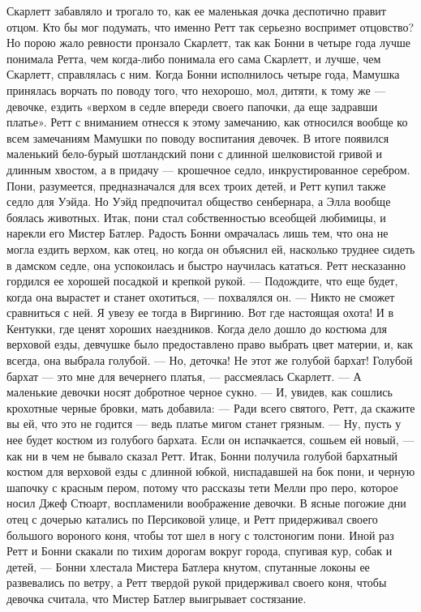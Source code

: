 Скарлетт забавляло и трогало то, как ее маленькая дочка деспотично правит отцом. Кто бы мог подумать, что именно Ретт так серьезно воспримет отцовство? Но порою жало ревности пронзало Скарлетт, так как Бонни в четыре года лучше понимала Ретта, чем когда-либо понимала его сама Скарлетт, и лучше, чем Скарлетт, справлялась с ним.
Когда Бонни исполнилось четыре года, Мамушка принялась ворчать по поводу того, что нехорошо, мол, дитяти, к тому же — девочке, ездить «верхом в седле впереди своего папочки, да еще задравши платье». Ретт с вниманием отнесся к этому замечанию, как относился вообще ко всем замечаниям Мамушки по поводу воспитания девочек. В итоге появился маленький бело-бурый шотландский пони с длинной шелковистой гривой и длинным хвостом, а в придачу — крошечное седло, инкрустированное серебром. Пони, разумеется, предназначался для всех троих детей, и Ретт купил также седло для Уэйда. Но Уэйд предпочитал общество сенбернара, а Элла вообще боялась животных. Итак, пони стал собственностью всеобщей любимицы, и нарекли его Мистер Батлер. Радость Бонни омрачалась лишь тем, что она не могла ездить верхом, как отец, но когда он объяснил ей, насколько труднее сидеть в дамском седле, она успокоилась и быстро научилась кататься. Ретт несказанно гордился ее хорошей посадкой и крепкой рукой.
— Подождите, что еще будет, когда она вырастет и станет охотиться, — похвалялся он. — Никто не сможет сравниться с ней. Я увезу ее тогда в Виргинию. Вот где настоящая охота! И в Кентукки, где ценят хороших наездников. Когда дело дошло до костюма для верховой езды, девчушке было предоставлено право выбрать цвет материи, и, как всегда, она выбрала голубой.
— Но, деточка! Не этот же голубой бархат! Голубой бархат — это мне для вечернего платья, — рассмеялась Скарлетт. — А маленькие девочки носят добротное черное сукно. — И, увидев, как сошлись крохотные черные бровки, мать добавила: — Ради всего святого, Ретт, да скажите вы ей, что это не годится — ведь платье мигом станет грязным.
— Ну, пусть у нее будет костюм из голубого бархата. Если он испачкается, сошьем ей новый, — как ни в чем не бывало сказал Ретт.
Итак, Бонни получила голубой бархатный костюм для верховой езды с длинной юбкой, ниспадавшей на бок пони, и черную шапочку с красным пером, потому что рассказы тети Мелли про перо, которое носил Джеф Стюарт, воспламенили воображение девочки. В ясные погожие дни отец с дочерью катались по Персиковой улице, и Ретт придерживал своего большого вороного коня, чтобы тот шел в ногу с толстоногим пони. Иной раз Ретт и Бонни скакали по тихим дорогам вокруг города, спугивая кур, собак и детей, — Бонни хлестала Мистера Батлера кнутом, спутанные локоны ее развевались по ветру, а Ретт твердой рукой придерживал своего коня, чтобы девочка считала, что Мистер Батлер выигрывает состязание.
